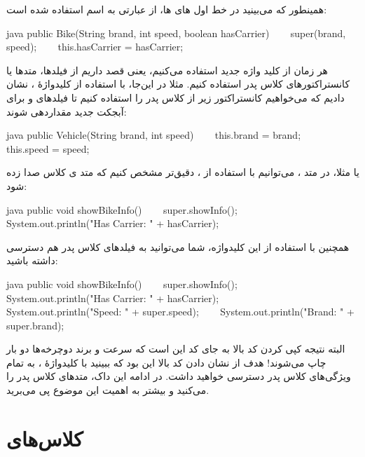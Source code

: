 همینطور که می‌بینید در خط اول  های  ها، از
عبارتی به اسم  استفاده شده است:

\begin{codebox}{java}
public Bike(String brand, int speed, boolean hasCarrier) {
    super(brand, speed);
    this.hasCarrier = hasCarrier;  
}
\end{codebox}

هر زمان از کلید واژه جدید  استفاده می‌کنیم، یعنی قصد داریم از
فیلدها، متدها یا کانستراکتورهای کلاس پدر استفاده کنیم. مثلا در این‌جا، با
استفاده از کلیدواژهٔ  ، نشان دادیم که می‌خواهیم
کانستراکتور زیر از کلاس پدر را استفاده کنیم تا فیلدهای
 و  برای آبجکت جدید مقداردهی شوند:

\begin{codebox}{java}
public Vehicle(String brand, int speed) {
    this.brand = brand;
    this.speed = speed;  
}
\end{codebox}

یا مثلا، در متد  ، می‌توانیم با استفاده از
 ، دقیق‌تر مشخص کنیم که متد  ی
کلاس  صدا زده شود:

\begin{codebox}{java}
public void showBikeInfo() {
    super.showInfo();  
    System.out.println("Has Carrier: " + hasCarrier);  
}
\end{codebox}

همچنین با استفاده از این کلیدواژه، شما می‌توانید به فیلدهای کلاس پدر هم
دسترسی داشته باشید:

\begin{codebox}{java}
public void showBikeInfo() {
    super.showInfo();  
    System.out.println("Has Carrier: " + hasCarrier);  
      
    System.out.println("Speed: " + super.speed);  
    System.out.println("Brand: " + super.brand);  
}
\end{codebox}

البته نتیجه کپی کردن کد بالا به جای کد  این
است که سرعت و برند دوچرخه‌ها دو بار چاپ می‌شوند! هدف از نشان دادن کد بالا
این بود که ببینید با کلیدواژهٔ  ، به تمام ویژگی‌های کلاس پدر
دسترسی خواهید داشت. در ادامه این داک، متدهای کلاس پدر را 
می‌کنید و بیشتر به اهمیت این موضوع پی می‌برید.

\section{کلاس‌های }

